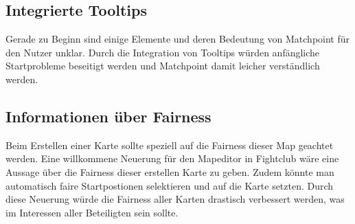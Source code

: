 \subsection{Integrierte Tooltips}\label{subsec:integrierte-tooltipps}
Gerade zu Beginn sind einige Elemente und deren Bedeutung von Matchpoint f\"ur den Nutzer unklar.
Durch die Integration von Tooltips w\"urden anf\"angliche Startprobleme beseitigt werden und Matchpoint damit leicher verst\"andlich werden.

\subsection{Informationen \"uber Fairness}\label{subsec:informationen-ueber-fairness}
Beim Erstellen einer Karte sollte speziell auf die Fairness dieser Map geachtet werden.
Eine willkommene Neuerung f\"ur den Mapeditor in Fightclub w\"are eine Aussage \"uber die Fairness dieser erstellen Karte zu geben.
Zudem k\"onnte man automatisch faire Startpostionen selektieren und auf die Karte setzten.
Durch diese Neuerung w\"urde die Fairness aller Karten drastisch verbessert werden, was im Interessen aller Beteiligten sein sollte.

\bigskip
\newpage